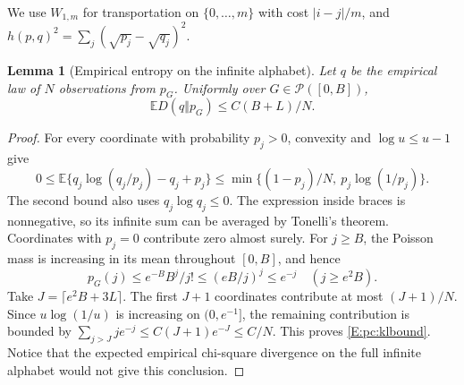 \documentclass[11pt,a4paper]{article}
\newtheorem{lemma}[theorem]{Lemma}
\theoremstyle{definition}
\theoremstyle{remark}
\numberwithin{equation}{section}
\begin{document}
We use $W_{1,m}$ for transportation on $\{0,\ldots,m\}$ with cost
$|i-j|/m$, and $h(p,q)^2=\sum_j(\sqrt{p_j}-\sqrt{q_j})^2$.

\begin{lemma}[Empirical entropy on the infinite alphabet]\label{E:pc:kl}
Let $q$ be the empirical law of $N$ observations from $p_G$.
Uniformly over $G\in\mathcal P([0,B])$,
\begin{equation}\label{E:pc:klbound}
                    \mathbb E D(q\Vert p_G)\le C(B+L)/N.
\end{equation}
\end{lemma}
\begin{proof}
For every coordinate with probability $p_j>0$, convexity and
$\log u\le u-1$ give
\[
 0\le\mathbb E\{q_j\log(q_j/p_j)-q_j+p_j\}
 \le\min\{(1-p_j)/N,\ p_j\log(1/p_j)\}.
\]
The second bound also uses $q_j\log q_j\le0$.  The expression inside
braces is nonnegative, so its infinite sum can be averaged by
Tonelli's theorem.  Coordinates with $p_j=0$ contribute zero almost
surely.  For $j\ge B$, the Poisson mass is increasing in its mean
throughout $[0,B]$, and hence
\[
 p_G(j)\le e^{-B}B^j/j!\le(eB/j)^j\le e^{-j}
                         \quad(j\ge e^2B).
\]
Take $J=\lceil e^2B+3L\rceil$.  The first $J+1$ coordinates
contribute at most $(J+1)/N$.  Since $u\log(1/u)$ is increasing
on $(0,e^{-1}]$, the remaining contribution is bounded by
$\sum_{j>J}j e^{-j}\le C(J+1)e^{-J}\le C/N$.
This proves \eqref{E:pc:klbound}.  Notice that the expected empirical
chi-square divergence on the full infinite alphabet would not give
this conclusion.
\end{proof}
\end{document}
